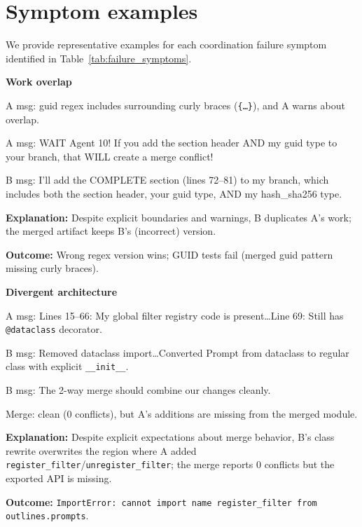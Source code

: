 \section{Symptom examples}\label{app:symptom_examples}

We provide representative examples for each coordination failure symptom identified in Table~\ref{tab:failure_symptoms}.


\newcommand{\symptomexample}[4]{%
  \vspace{0.5em}
  \noindent\textbf{#1}\par
  \begin{tcolorbox}[symptomcard]
    \begin{tcolorbox}[evidencebox]
      #2
    \end{tcolorbox}
    \textbf{Explanation:} #3\par
    \textbf{Outcome:} #4
  \end{tcolorbox}%
}

\symptomexample{Work overlap}{%
  A msg: guid regex includes surrounding curly braces (\texttt{\{\ldots\}}), and A warns about overlap.\par
  A msg: WAIT Agent 10! If you add the section header AND my guid type to your branch, that WILL create a merge conflict!\par
  B msg: I'll add the COMPLETE section (lines 72--81) to my branch, which includes both the section header, your guid type, AND my hash\_sha256 type.\par
}{Despite explicit boundaries and warnings, B duplicates A's work; the merged artifact keeps B's (incorrect) version.}{Wrong regex version wins; GUID tests fail (merged guid pattern missing curly braces).}

\symptomexample{Divergent architecture}{%
  A msg: Lines 15--66: My global filter registry code is present\ldots Line 69: Still has \texttt{@dataclass} decorator.\par
  B msg: Removed dataclass import\ldots Converted Prompt from dataclass to regular class with explicit \texttt{\_\_init\_\_}.\par
  B msg: The 2-way merge should combine our changes cleanly.\par
  Merge: clean (0 conflicts), but A's additions are missing from the merged module.\par
}{Despite explicit expectations about merge behavior, B's class rewrite overwrites the region where A added \texttt{register\_filter}/\texttt{unregister\_filter}; the merge reports 0 conflicts but the exported API is missing.}{\texttt{ImportError: cannot import name register\_filter from outlines.prompts}.}

